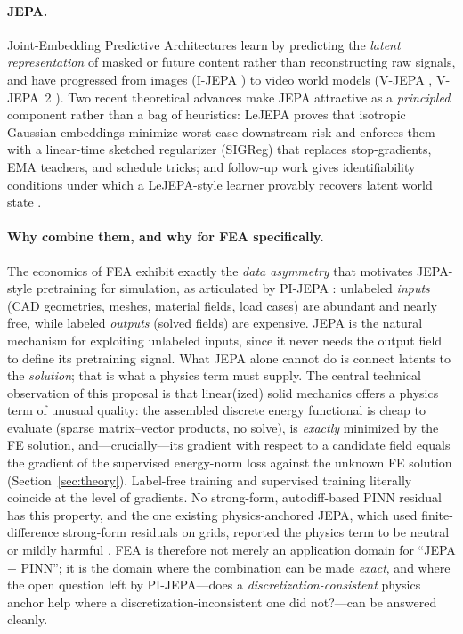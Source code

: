 \documentclass[11pt]{article}
\begin{document}
\paragraph{JEPA.}
Joint-Embedding Predictive Architectures \cite{lecun2022} learn by predicting
the \emph{latent representation} of masked or future content rather than
reconstructing raw signals, and have progressed from images (I-JEPA
\cite{assran2023ijepa}) to video world models (V-JEPA \cite{bardes2024vjepa},
V-JEPA~2 \cite{meta2025vjepa2}). Two recent theoretical advances make JEPA
attractive as a \emph{principled} component rather than a bag of heuristics:
LeJEPA \cite{balestriero2025lejepa} proves that isotropic Gaussian embeddings
minimize worst-case downstream risk and enforces them with a linear-time
sketched regularizer (SIGReg) that replaces stop-gradients, EMA teachers, and
schedule tricks; and follow-up work gives identifiability conditions under
which a LeJEPA-style learner provably recovers latent world state
\cite{klindt2026}.

\paragraph{Why combine them, and why for FEA specifically.}
The economics of FEA exhibit exactly the \emph{data asymmetry} that motivates
JEPA-style pretraining for simulation, as articulated by PI-JEPA
\cite{yee2026pijepa}: unlabeled \emph{inputs} (CAD geometries, meshes,
material fields, load cases) are abundant and nearly free, while labeled
\emph{outputs} (solved fields) are expensive. JEPA is the natural mechanism
for exploiting unlabeled inputs, since it never needs the output field to
define its pretraining signal. What JEPA alone cannot do is connect latents to
the \emph{solution}; that is what a physics term must supply. The central
technical observation of this proposal is that linear(ized) solid mechanics
offers a physics term of unusual quality: the assembled discrete energy
functional is cheap to evaluate (sparse matrix--vector products, no solve), is
\emph{exactly} minimized by the FE solution, and---crucially---its gradient
with respect to a candidate field equals the gradient of the supervised
energy-norm loss against the unknown FE solution (Section~\ref{sec:theory}).
Label-free training and supervised training literally coincide at the level of
gradients. No strong-form, autodiff-based PINN residual has this property, and
the one existing physics-anchored JEPA, which used finite-difference
strong-form residuals on grids, reported the physics term to be neutral or
mildly harmful \cite{yee2026pijepa}. FEA is therefore not merely an
application domain for ``JEPA + PINN''; it is the domain where the combination
can be made \emph{exact}, and where the open question left by PI-JEPA---does a
\emph{discretization-consistent} physics anchor help where a
discretization-inconsistent one did not?---can be answered cleanly.
\end{document}
